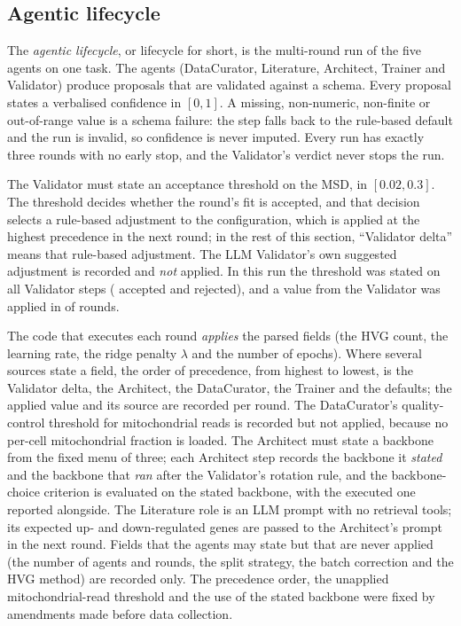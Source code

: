 \subsection{Agentic lifecycle}\label{subsec:lifecycle}

The \emph{agentic lifecycle}, or lifecycle for short, is the multi-round run of the five
agents on one task. The agents (DataCurator, Literature, Architect, Trainer and Validator)
produce proposals that are validated against a schema. Every proposal states a verbalised confidence in $[0,1]$. A
missing, non-numeric, non-finite or out-of-range value is a schema failure: the step falls
back to the rule-based default and the run is invalid, so confidence is never imputed. Every
run has exactly three rounds with no early stop, and the Validator's verdict never stops the
run.

The Validator must state an acceptance threshold on the MSD, in $[0.02,0.3]$. The threshold
decides whether the round's fit is accepted, and that decision selects a rule-based
adjustment to the configuration, which is applied at the highest precedence in the next
round; in the rest of this section, ``Validator delta'' means that rule-based adjustment. The LLM Validator's own
suggested adjustment is recorded and \emph{not} applied. In this run the threshold was stated
on all \resNValidatorSteps{} Validator steps (\resValidatorAccepted{} accepted and
\resValidatorRejected{} rejected), and a value from the Validator was applied in
\resValidatorSourcedRounds{} of \resNRoundsTotal{} rounds.

The code that executes each round \emph{applies} the parsed fields (the HVG count, the
learning rate, the ridge penalty $\lambda$ and the number of epochs). Where several sources
state a field, the order of precedence, from highest to lowest, is the Validator delta, the
Architect, the DataCurator, the Trainer and the defaults; the applied value and its source are
recorded per round. The DataCurator's
quality-control threshold for mitochondrial reads is recorded but not applied, because no per-cell
mitochondrial fraction is loaded. The Architect must state a backbone from the fixed menu of
three; each Architect step records the backbone it \emph{stated} and the backbone that
\emph{ran} after the Validator's rotation rule, and the backbone-choice criterion is evaluated
on the stated backbone, with the executed one reported alongside. The Literature role is an
LLM prompt with no retrieval tools; its expected up- and down-regulated genes are passed to
the Architect's prompt in the next round. Fields that the agents may state but that are
never applied (the number of agents and rounds, the split strategy, the batch correction and the
HVG method) are recorded only. The precedence order, the unapplied mitochondrial-read
threshold and the use of the stated backbone were fixed by amendments made before data
collection.

